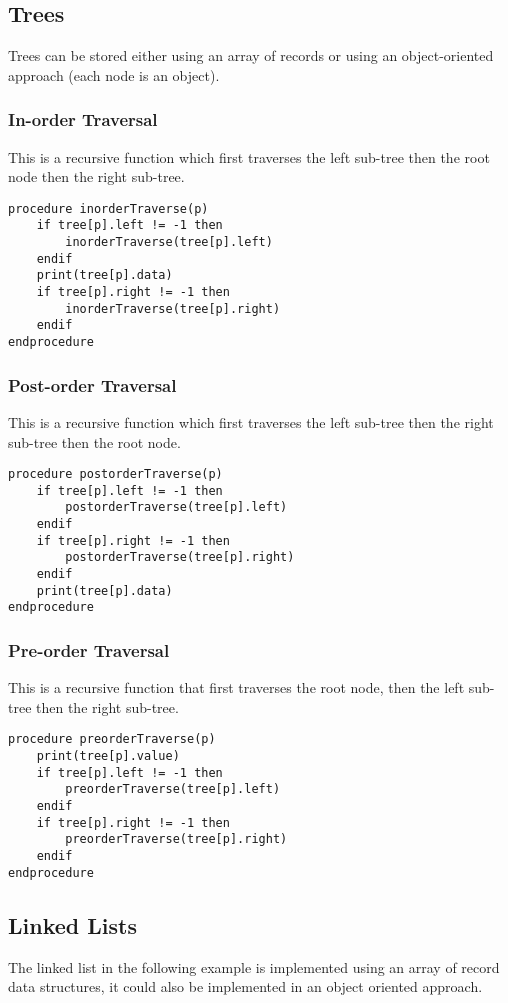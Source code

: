 \documentclass[a4paper,11pt]{article}
\begin{document}
\subsection{Trees}
Trees can be stored either using an array of records or using an object-oriented approach (each node is an object). 
\subsubsection{In-order Traversal}
This is a recursive function which first traverses the left sub-tree then the root node then the right sub-tree.
\begin{Verbatim}[breaklines=true, breakanywhere=true]
procedure inorderTraverse(p)
    if tree[p].left != -1 then
        inorderTraverse(tree[p].left)
    endif
    print(tree[p].data)
    if tree[p].right != -1 then
        inorderTraverse(tree[p].right)
    endif
endprocedure
\end{Verbatim}
\subsubsection{Post-order Traversal}
This is a recursive function which first traverses the left sub-tree then the right sub-tree then the root node.
\begin{Verbatim}[breaklines=true, breakanywhere=true]
procedure postorderTraverse(p)
    if tree[p].left != -1 then
        postorderTraverse(tree[p].left)
    endif
    if tree[p].right != -1 then
        postorderTraverse(tree[p].right)
    endif
    print(tree[p].data)
endprocedure
\end{Verbatim}
\subsubsection{Pre-order Traversal}
This is a recursive function that first traverses the root node, then the left sub-tree then the right sub-tree.
\begin{Verbatim}[breaklines=true, breakanywhere=true]
procedure preorderTraverse(p)
    print(tree[p].value)
    if tree[p].left != -1 then
        preorderTraverse(tree[p].left)
    endif
    if tree[p].right != -1 then
        preorderTraverse(tree[p].right)
    endif
endprocedure
\end{Verbatim}
\subsection{Linked Lists}
The linked list in the following example is implemented using an array of record data structures, it could also be implemented in an object oriented approach.
\end{document}
